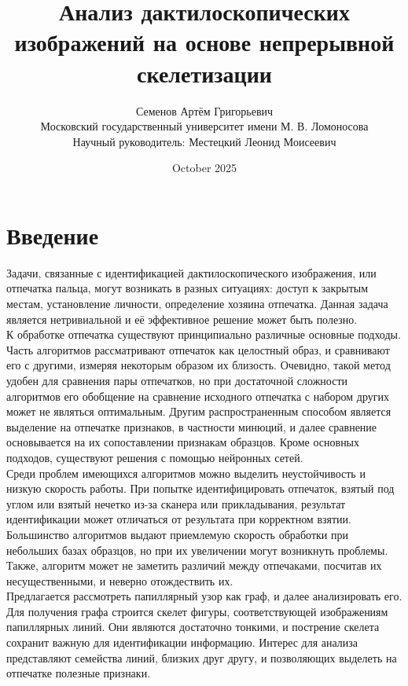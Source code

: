 \documentclass{article}
\title{Анализ дактилоскопических изображений на основе непрерывной скелетизации}
\author{ Семенов Артём Григорьевич\\
	Московский государственный университет имени М. В. Ломоносова \\
        Научный руководитель: Местецкий Леонид Моисеевич \\ }
\date{October 2025}
\begin{document}
\maketitle

\section{Введение}
Задачи, связанные с идентификацией дактилоскопического изображения, или отпечатка пальца, могут возникать в разных ситуациях: доступ к закрытым местам, установление личности, определение хозяина отпечатка. Данная задача является нетривиальной и её эффективное решение может быть полезно. \\
К обработке отпечатка существуют принципиально различные основные подходы. Часть алгоритмов рассматривают отпечаток как целостный образ, и сравнивают его с другими, измеряя некоторым образом их близость. Очевидно, такой метод удобен для сравнения пары отпечатков, но при достаточной сложности алгоритмов его обобщение на сравнение исходного отпечатка с набором других может не являться оптимальным. Другим распространенным способом является выделение на отпечатке признаков, в частности минюций, и далее сравнение основывается на их сопоставлении признакам образцов. Кроме основных подходов, существуют решения с помощью нейронных сетей. \\
Среди проблем имеющихся алгоритмов можно выделить неустойчивость и низкую скорость работы. При попытке идентифицировать отпечаток, взятый под углом или взятый нечетко из-за сканера или прикладывания, результат идентификации может отличаться от результата при корректном взятии. Большинство алгоритмов выдают приемлемую скорость обработки при небольших базах образцов, но при их увеличении могут возникнуть проблемы. Также, алгоритм может не заметить различий между отпечаками, посчитав их несущественными, и неверно отождествить их. \\
Предлагается рассмотреть папиллярный узор как граф, и далее анализировать его. Для получения графа строится скелет фигуры, соответствующей изображениям папиллярных линий. Они являются достаточно тонкими, и пострение скелета сохранит важную для идентификации информацию. Интерес для анализа представляют семейства линий, близких друг другу, и позволяющих выделеть на отпечатке полезные признаки.
\end{document}
